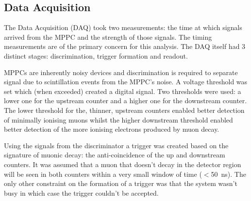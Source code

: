 \documentclass[]{article}
\begin{document}
\subsection{Data Acquisition} %
\label{sub:data_acquisition}
The Data Acquisition (DAQ) took two measurements: the time at which signals arrived from the MPPC and the strength of those signals. The timing measurements are of the primary concern for this analysis. The DAQ itself had 3 distinct stages: discrimination, trigger formation and readout.

MPPCs are inherently noisy devices and discrimination is required to separate signal due to scintillation events from the MPPC's noise. A voltage threshold was set which (when exceeded) created a digital signal. Two thresholds were used: a lower one for the upstream counter and a higher one for the downstream counter. The lower threshold for the, thinner, upstream counters enabled better detection of minimally ionising muons whilst the higher downstream threshold enabled better detection of the more ionising electrons produced by muon decay. 

Using the signals from the discriminator a trigger was created based on the signature of muonic decay: the anti-coincidence of the up and downstream counters. It was assumed that a muon that doesn't decay in the detector region will be seen in both counters within a very small window of time ($<$50~ns). The only other constraint on the formation of a trigger was that the system wasn't busy in which case the trigger couldn't be accepted.
\end{document}

